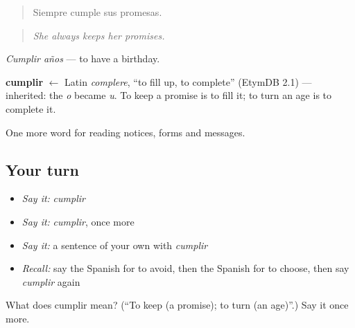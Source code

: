 \begin{quote}
Siempre cumple sus promesas.
\end{quote}

\begin{quote}
\emph{She always keeps her promises.}
\end{quote}

\emph{Cumplir años} — to have a birthday.

\begin{cousinweb}
\textbf{cumplir} $\leftarrow$ Latin \emph{complere}, \textquotedblleft{}to fill up, to complete\textquotedblright{} (EtymDB 2.1) — inherited: the \emph{o} became \emph{u}. To keep a promise is to fill it; to turn an age is to complete it.
\end{cousinweb}

\begin{grammarlens}[title={What you've built}]
One more word for reading notices, forms and messages.
\end{grammarlens}

\subsection*{Your turn}
\begin{itemize}
\raggedright
  \item \emph{Say it:} \emph{cumplir}
  \item \emph{Say it:} \emph{cumplir}, once more
  \item \emph{Say it:} a sentence of your own with \emph{cumplir}
  \item \emph{Recall:} say the Spanish for to avoid, then the Spanish for to choose, then say \emph{cumplir} again
\end{itemize}

\begin{tcolorbox}[breakable,colback=teal!4,colframe=teal!35!black,title={Before you move on}]
What does cumplir mean? (\textquotedblleft{}To keep (a promise); to turn (an age)\textquotedblright{}.) Say it once more.
\end{tcolorbox}
